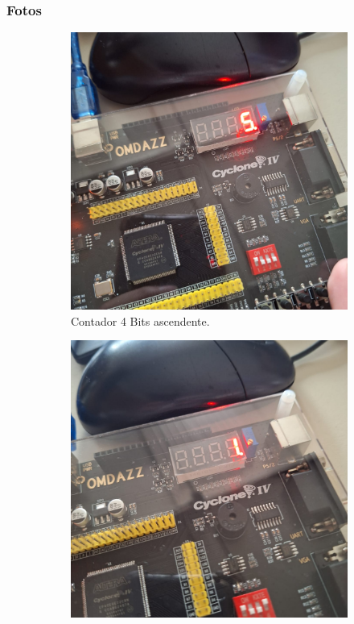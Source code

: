 \subsubsection*{Fotos}

\begin{figure}[H]
    \centering
    \begin{subfigure}{0.45\linewidth}
        \centering
        \includegraphics[width=\linewidth]{imagenes/Cnt8.jpg}
        \caption{Contador 4 Bits ascendente.}\label{fig:R1-1}
    \end{subfigure}
    \hfill
    \begin{subfigure}{0.45\linewidth}
        \centering
        \includegraphics[width=\linewidth]{imagenes/Cnt8_2.jpg}

\end{subfigure}
\end{figure}
